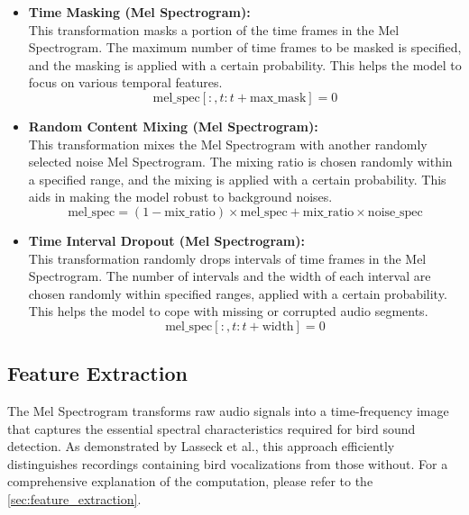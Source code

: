 \begin{itemize}
            \item \textbf{Time Masking (Mel Spectrogram):}\\
            This transformation masks a portion of the time frames in the Mel Spectrogram. The maximum number of time frames to be masked is specified, and the masking is applied with a certain probability. This helps the model to focus on various temporal features.
            \begin{equation}
            \text{mel\_spec}[:, t:t+\text{max\_mask}] = 0
            \end{equation}

            \item \textbf{Random Content Mixing (Mel Spectrogram):}\\
            This transformation mixes the Mel Spectrogram with another randomly selected noise Mel Spectrogram. The mixing ratio is chosen randomly within a specified range, and the mixing is applied with a certain probability. This aids in making the model robust to background noises.
            \begin{equation}
            \text{mel\_spec} = (1 - \text{mix\_ratio}) \times \text{mel\_spec} + \text{mix\_ratio} \times \text{noise\_spec}
            \end{equation}

            \item \textbf{Time Interval Dropout (Mel Spectrogram):}\\
            This transformation randomly drops intervals of time frames in the Mel Spectrogram. The number of intervals and the width of each interval are chosen randomly within specified ranges, applied with a certain probability. This helps the model to cope with missing or corrupted audio segments.
            \begin{equation}
            \text{mel\_spec}[:, t:t+\text{width}] = 0
            \end{equation}
      \end{itemize}

      \subsection{Feature Extraction}
      The Mel Spectrogram transforms raw audio signals into a time-frequency image that captures the essential spectral characteristics required for bird sound detection. As demonstrated by Lasseck et al.\cite{lasseck2018acoustic}, this approach efficiently distinguishes recordings containing bird vocalizations from those without. For a comprehensive explanation of the computation, please refer to the \ref{sec:feature_extraction}.

